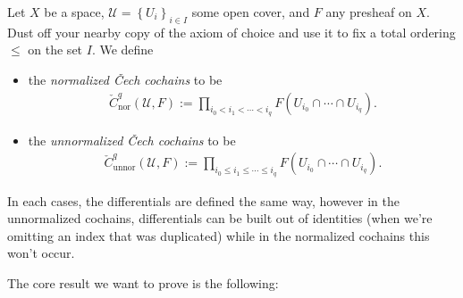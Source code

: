 \documentclass[11pt]{book}
\begin{document}
\begin{definition}\label{def:normalized-unnormalized-cochains} Let $X$ be a space, $\mathcal{U} = \left\{ U_i \right\}_{i\in I}$ some open cover, and $F$ any presheaf on $X$. Dust off your nearby copy of the axiom of choice and use it to fix a total ordering $\le$ on the set $I$. We define
\begin{itemize}
    \item the \emph{normalized \v{C}ech cochains} to be
    \begin{align*}
        \check{C}^q_\text{nor}(\mathcal{U},F) := \prod_{i_0 < i_1 < \cdots < i_q} F(U_{i_0}\cap \cdots \cap U_{i_q}).
    \end{align*}
    \item the \emph{unnormalized \v{C}ech cochains} to be
    \begin{align*}
        \check{C}^q_\text{unnor}(\mathcal{U},F) := \prod_{i_0\le i_1\le \cdots \le i_q} F(U_{i_0}\cap \cdots \cap U_{i_q}).
    \end{align*}
\end{itemize}
In each cases, the differentials are defined the same way, however in the unnormalized cochains, differentials can be built out of identities (when we're omitting an index that was duplicated) while in the normalized cochains this won't occur.
\end{definition}

The core result we want to prove is the following:
\end{document}
